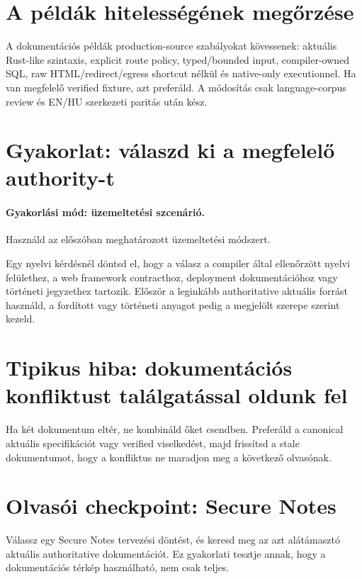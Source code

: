 \section{A példák hitelességének megőrzése}

A dokumentációs példák production-source szabályokat kövessenek: aktuális Rust-like szintaxis, explicit route policy, typed/bounded input, compiler-owned SQL, raw HTML/redirect/egress shortcut nélkül és native-only executionnel. Ha van megfelelő verified  fixture, azt preferáld. A módosítás csak language-corpus review és EN/HU szerkezeti paritás után kész.

\section{Gyakorlat: válaszd ki a megfelelő authority-t}
\paragraph{Gyakorlási mód: üzemeltetési szcenárió.} Használd az előszóban meghatározott üzemeltetési módszert.

Egy nyelvi kérdésnél döntsd el, hogy a válasz a compiler által ellenőrzött nyelvi felülethez, a web framework contracthoz, deployment dokumentációhoz vagy történeti jegyzethez tartozik. Először a leginkább authoritative aktuális forrást használd, a fordított vagy történeti anyagot pedig a megjelölt szerepe szerint kezeld.

\section{Tipikus hiba: dokumentációs konfliktust találgatással oldunk fel}
Ha két dokumentum eltér, ne kombináld őket csendben. Preferáld a canonical aktuális specifikációt vagy verified viselkedést, majd frissítsd a stale dokumentumot, hogy a konfliktus ne maradjon meg a következő olvasónak.

\section{Olvasói checkpoint: Secure Notes}
Válassz egy Secure Notes tervezési döntést, és keresd meg az azt alátámasztó aktuális authoritative dokumentációt. Ez gyakorlati tesztje annak, hogy a dokumentációs térkép használható, nem csak teljes.
